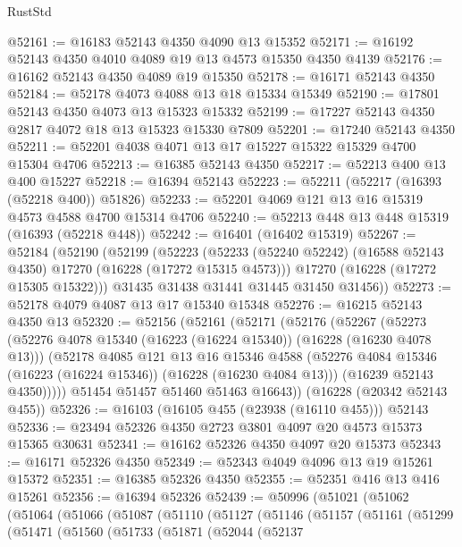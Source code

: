 \begin{lexlean}{RustStd}
\begin{coremodule}
@52161 := @16183 @52143 @4350 @4090 @13 @15352
@52171 := @16192 @52143 @4350 @4010 @4089 @19 @13 @4573 @15350 @4350 @4139
@52176 := @16162 @52143 @4350 @4089 @19 @15350
@52178 := @16171 @52143 @4350
@52184 := @52178 @4073 @4088 @13 @18 @15334 @15349
@52190 := @17801 @52143 @4350 @4073 @13 @15323 @15332
@52199 := @17227 @52143 @4350 @2817 @4072 @18 @13 @15323 @15330 @7809
@52201 := @17240 @52143 @4350
@52211 := @52201 @4038 @4071 @13 @17 @15227 @15322 @15329 @4700 @15304 @4706
@52213 := @16385 @52143 @4350
@52217 := @52213 @400 @13 @400 @15227
@52218 := @16394 @52143
@52223 := @52211 (@52217 (@16393 (@52218 @400)) @51826)
@52233 := @52201 @4069 @121 @13 @16 @15319 @4573 @4588 @4700 @15314 @4706
@52240 := @52213 @448 @13 @448 @15319 (@16393 (@52218 @448))
@52242 := @16401 (@16402 @15319)
@52267 := @52184
    (@52190
      (@52199
        (@52223
          (@52233 (@52240 @52242) (@16588 @52143 @4350) @17270 (@16228 (@17272 @15315 @4573)))
          @17270
          (@16228 (@17272 @15305 @15322)))
        @31435
        @31438
        @31441
        @31445
        @31450
        @31456))
@52273 := @52178 @4079 @4087 @13 @17 @15340 @15348
@52276 := @16215 @52143 @4350 @13
@52320 := @52156
    (@52161
      (@52171
        (@52176
          (@52267
            (@52273
              (@52276 @4078 @15340 (@16223 (@16224 @15340)) (@16228 (@16230 @4078 @13)))
              (@52178
                @4085
                @121
                @13
                @16
                @15346
                @4588
                (@52276 @4084 @15346 (@16223 (@16224 @15346)) (@16228 (@16230 @4084 @13)))
                (@16239 @52143 @4350)))))
        @51454
        @51457
        @51460
        @51463
        @16643))
    (@16228 (@20342 @52143 @455))
@52326 := @16103 (@16105 @455 (@23938 (@16110 @455))) @52143
@52336 := @23494 @52326 @4350 @2723 @3801 @4097 @20 @4573 @15373 @15365 @30631
@52341 := @16162 @52326 @4350 @4097 @20 @15373
@52343 := @16171 @52326 @4350
@52349 := @52343 @4049 @4096 @13 @19 @15261 @15372
@52351 := @16385 @52326 @4350
@52355 := @52351 @416 @13 @416 @15261
@52356 := @16394 @52326
@52439 := @50996
    (@51021
      (@51062
        (@51064
          (@51066
            (@51087
              (@51110
                (@51127
                  (@51146
                    (@51157
                      (@51161
                        (@51299
                          (@51471
                            (@51560
                              (@51733
                                (@51871
                                  (@52044
                                    (@52137

\end{coremodule}
\end{lexlean}
